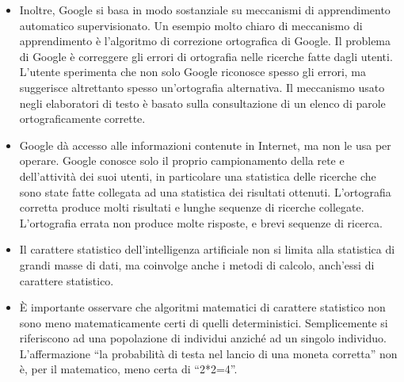\documentclass[xcolor=svgnames]{beamer}
\begin{document}
\begin{frame}
\begin{itemize}
\item Inoltre, Google si basa in modo sostanziale su meccanismi di apprendimento automatico supervisionato. Un esempio molto chiaro di meccanismo di apprendimento è l'algoritmo di correzione ortografica di Google. Il problema di Google è correggere gli errori di ortografia nelle ricerche fatte dagli utenti. L'utente sperimenta che non solo Google riconosce spesso gli errori, ma suggerisce altrettanto spesso un'ortografia alternativa. Il meccanismo usato negli elaboratori di testo è basato sulla consultazione di un elenco di parole ortograficamente corrette.
  \item Google dà accesso alle informazioni contenute in Internet, ma non le usa per operare. Google conosce solo il proprio campionamento della rete e dell'attività dei suoi utenti, in particolare una statistica delle ricerche che sono state fatte collegata ad una statistica dei risultati ottenuti. L'ortografia corretta produce molti risultati e lunghe sequenze di ricerche collegate. L'ortografia errata non produce molte risposte, e brevi sequenze di ricerca.
  \item Il carattere statistico dell'intelligenza artificiale non si limita alla statistica di grandi masse di dati, ma coinvolge anche i metodi di calcolo, anch'essi di carattere statistico.
  \item \`E importante osservare che algoritmi matematici di carattere statistico non sono meno matematicamente certi di quelli deterministici. Semplicemente si riferiscono ad una popolazione di individui anziché ad un singolo individuo. L'affermazione ``la probabilità di testa nel lancio di una moneta corretta'' non è, per il matematico, meno certa di ``2*2=4''.\end{itemize}
\end{frame}
\end{document}
